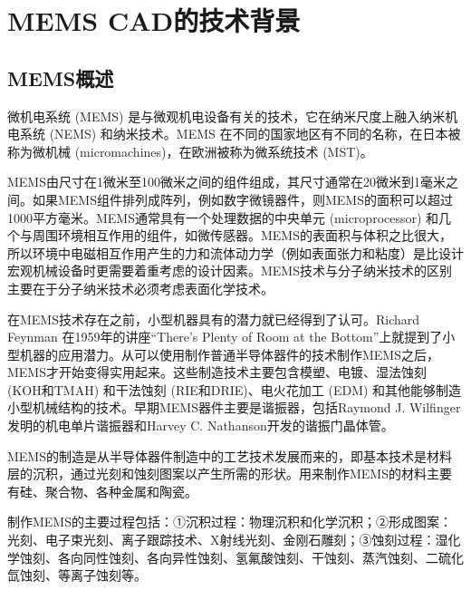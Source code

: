 \documentclass[no-math]{YangThesis}
\begin{document}
\clearpage
\vspace{-1cm}
\section{MEMS CAD的技术背景}

\setcounter{page}{1}

\subsection{MEMS概述}
微机电系统 (MEMS) 是与微观机电设备有关的技术，它在纳米尺度上融入纳米机电系统 (NEMS) 和纳米技术。MEMS 在不同的国家地区有不同的名称，在日本被称为微机械 (micromachines)，在欧洲被称为微系统技术 (MST)。

MEMS由尺寸在1微米至100微米之间的组件组成，其尺寸通常在20微米到1毫米之间。如果MEMS组件排列成阵列，例如数字微镜器件，则MEMS的面积可以超过1000平方毫米\cite{bibc1}。MEMS通常具有一个处理数据的中央单元 (microprocessor) 和几个与周围环境相互作用的组件，如微传感器\cite{bibc2}。MEMS的表面积与体积之比很大，所以环境中电磁相互作用产生的力和流体动力学（例如表面张力和粘度）是比设计宏观机械设备时更需要着重考虑的设计因素。MEMS技术与分子纳米技术的区别主要在于分子纳米技术必须考虑表面化学技术。

在MEMS技术存在之前，小型机器具有的潜力就已经得到了认可。Richard Feynman 在1959年的讲座“There's Plenty of Room at the Bottom”上就提到了小型机器的应用潜力。从可以使用制作普通半导体器件的技术制作MEMS之后，MEMS才开始变得实用起来\cite{bibc3}。这些制造技术主要包含模塑、电镀、湿法蚀刻 (KOH和TMAH) 和干法蚀刻 (RIE和DRIE)、电火花加工 (EDM) 和其他能够制造小型机械结构的技术。早期MEMS器件主要是谐振器，包括Raymond J. Wilfinger \cite{bibc4,bibc5}发明的机电单片谐振器和Harvey C. Nathanson开发的谐振门晶体管\cite{bibc6}。

MEMS的制造是从半导体器件制造中的工艺技术发展而来的，即基本技术是材料层的沉积，通过光刻和蚀刻图案以产生所需的形状\cite{bibc7}。用来制作MEMS的材料主要有硅、聚合物、各种金属和陶瓷\cite{bibc8,bibc9}。

制作MEMS的主要过程包括：①沉积过程：物理沉积和化学沉积；②形成图案：光刻、电子束光刻\cite{bibc10}、离子跟踪技术、X射线光刻、金刚石雕刻\cite{bibc11}；③蚀刻过程\cite{bibc12,bibc13}：湿化学蚀刻、各向同性蚀刻、各向异性蚀刻、氢氟酸蚀刻、干蚀刻、蒸汽蚀刻、二硫化氙蚀刻\cite{bibc14}、等离子蚀刻等。
\end{document}
